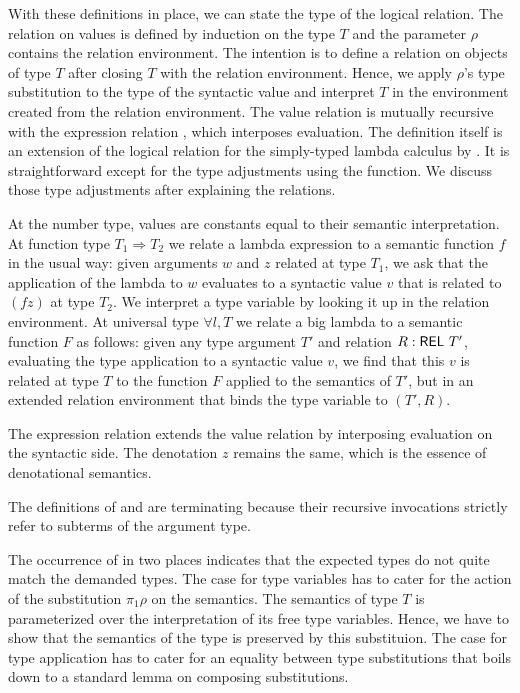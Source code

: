 \documentclass[acmsmall,anonymous,review,screen]{acmart}
\begin{document}
With these definitions in place, we can state the type of the logical relation.
\LogicalMCVType
The  relation {\AVSem} on values is defined by induction on the type $T$ and the parameter
$\rho$ contains the relation environment. The intention is to define a
relation on objects of type $T$ after closing $T$ with the relation
environment. Hence, we apply $\rho$'s type substitution to the type of
the syntactic value and interpret $T$ in the environment created from
the relation environment.
The value relation is mutually recursive with the expression relation
{\AESem}, which interposes evaluation.
\LogicalMCVBody
The definition itself is an extension of the logical relation for the
simply-typed lambda calculus by
\citet{DBLP:journals/jar/BentonHKM12}. It is straightforward
except for the type adjustments using the {\Asubst} function. We
discuss those type adjustments after explaining the relations.

At the number type, values are constants equal to their semantic
interpretation. 
 At function type $T_1 \Rightarrow T_2$ we relate a lambda expression
to a semantic function $f$ in
the usual way: given arguments $w$ and $z$ related at type $T_1$, we ask that the
application of the lambda to $w$ evaluates to a syntactic value $v$ that is
related to $(f z)$ at type $T_2$.
We interpret a type variable by looking it up in the relation
environment.
At universal type $\forall l, T$ we relate a big lambda to a semantic
function $F$ as follows: given any type argument $T'$ and relation $R :
\AREL\ T'$, evaluating the type application to a syntactic value $v$,
we find that this $v$ is related at type $T$ to the
function $F$ applied to the semantics of $T'$, but in an extended
relation environment that binds the type variable to $(T', R)$.

The expression relation extends the value relation by interposing
evaluation on the syntactic side. The denotation $z$ remains the
same, which is the essence of denotational semantics. 
\LogicalMCE

The definitions of {\AVSem} and {\AESem} are terminating because their
recursive invocations strictly refer to subterms of the argument type.

The occurrence of {\Asubst} in two places indicates that the expected types do not quite
match the demanded types.
The case for type variables has to cater for the action of the
substitution $\pi_1\rho$ on the semantics. The semantics of type $T$
is parameterized over the interpretation of its free type
variables. Hence, we have to show that the semantics of the type is
preserved by this substituion.
\TFsubstVarPreservesType
The case for type application has to cater for an equality between
type substitutions that boils down to a standard lemma on composing
substitutions.
\LogicallemmaOne
\end{document}
